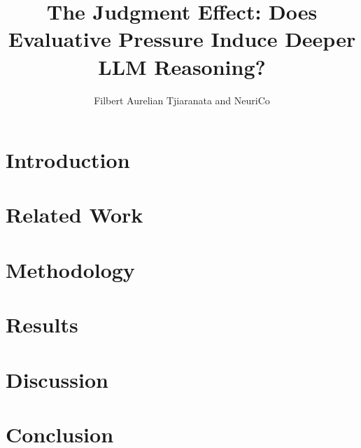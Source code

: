 \documentclass{article}
\author{Filbert Aurelian Tjiaranata and NeuriCo}
\title{The Judgment Effect: Does Evaluative Pressure Induce Deeper LLM Reasoning?}
\begin{document}
\maketitle

\begin{abstract}

\end{abstract}

\section{Introduction}
\label{sec:intro}


\section{Related Work}
\label{sec:related_work}


\section{Methodology}
\label{sec:methodology}


\section{Results}
\label{sec:results}


\section{Discussion}
\label{sec:discussion}


\section{Conclusion}
\label{sec:conclusion}



\end{document}
